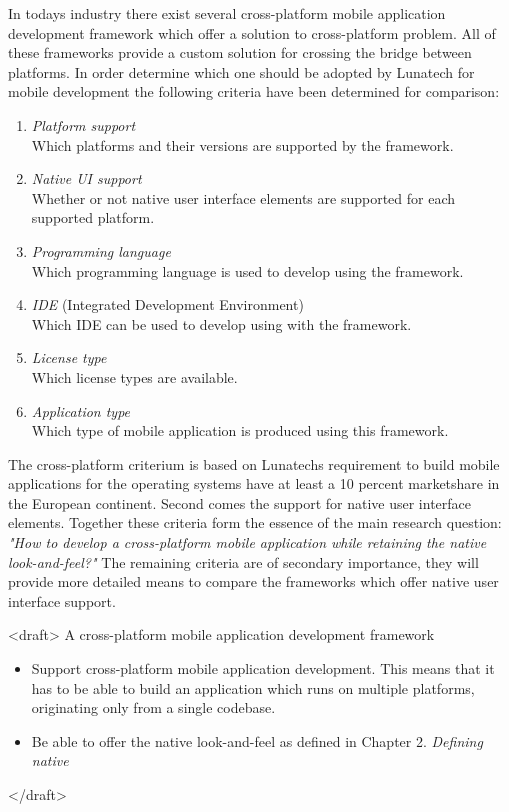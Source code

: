 In todays industry there exist several cross-platform mobile application development framework which offer a solution to cross-platform problem. All of these frameworks provide a custom solution for crossing the bridge between platforms. In order determine which one should be adopted by Lunatech for mobile development the following criteria have been determined for comparison:

\begin{enumerate}
\item \emph{Platform support}\\
Which platforms and their versions are supported by the framework.
\item \emph{Native UI support}\\
Whether or not native user interface elements are supported for each supported platform.
\item \emph{Programming language}\\
Which programming language is used to develop using the framework.
\item \emph{IDE} (Integrated Development Environment)\\
Which IDE can be used to develop using with the framework.
\item \emph{License type}\\
Which license types are available.
\item \emph{Application type}\\
Which type of mobile application is produced using this framework.
\end{enumerate}

The cross-platform criterium is based on Lunatechs requirement to build mobile applications for the operating systems have at least a 10 percent marketshare in the European continent. Second comes the support for native user interface elements. Together these criteria form the essence of the main research question: \emph{"How to develop a cross-platform mobile application while retaining the native look-and-feel?"}
The remaining criteria are of secondary importance, they will provide more detailed means to compare the frameworks which offer native user interface support.


<draft>
A cross-platform mobile application development framework
\begin{itemize}
\item Support cross-platform mobile application development. This means that it has to be able to build an application which runs on multiple platforms, originating only from a single codebase.
\item Be able to offer the native look-and-feel as defined in Chapter  2. \emph{Defining native}
\end{itemize}
</draft>

